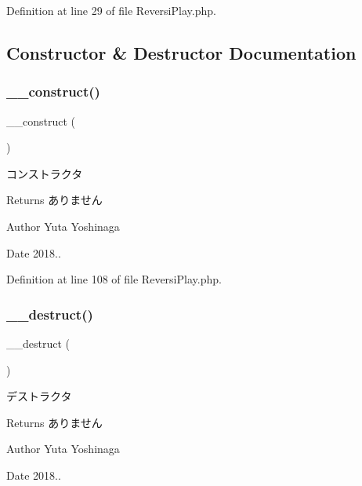 Definition at line 29 of file Reversi\+Play.\+php.



\subsection{Constructor \& Destructor Documentation}
\mbox{\label{class_reversi_play_a095c5d389db211932136b53f25f39685}} 
\subsubsection{\texorpdfstring{\+\_\+\+\_\+construct()}{\_\_construct()}}
{\footnotesize\ttfamily \+\_\+\+\_\+construct (\begin{DoxyParamCaption}{ }\end{DoxyParamCaption})}



コンストラクタ 

\begin{DoxyReturn}{Returns}
ありません 
\end{DoxyReturn}
\begin{DoxyAuthor}{Author}
Yuta Yoshinaga 
\end{DoxyAuthor}
\begin{DoxyDate}{Date}
2018.. 
\end{DoxyDate}


Definition at line 108 of file Reversi\+Play.\+php.

\mbox{\label{class_reversi_play_a421831a265621325e1fdd19aace0c758}} 
\subsubsection{\texorpdfstring{\+\_\+\+\_\+destruct()}{\_\_destruct()}}
{\footnotesize\ttfamily \+\_\+\+\_\+destruct (\begin{DoxyParamCaption}{ }\end{DoxyParamCaption})}



デストラクタ 

\begin{DoxyReturn}{Returns}
ありません 
\end{DoxyReturn}
\begin{DoxyAuthor}{Author}
Yuta Yoshinaga 
\end{DoxyAuthor}
\begin{DoxyDate}{Date}
2018.. 
\end{DoxyDate}


